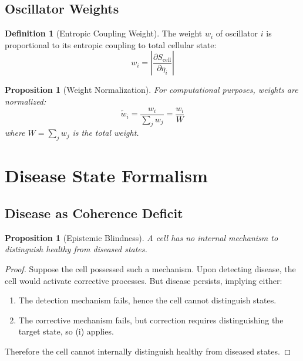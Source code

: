\documentclass[10pt,twocolumn]{article}
\theoremstyle{plain}
\newtheorem{proposition}[theorem]{Proposition}
\theoremstyle{definition}
\newtheorem{definition}[theorem]{Definition}
\theoremstyle{remark}
\begin{document}
\subsection{Oscillator Weights}

\begin{definition}[Entropic Coupling Weight]
\label{def:weight}
The weight $w_i$ of oscillator $i$ is proportional to its entropic coupling to total cellular state:
\begin{equation}
w_i = \left|\frac{\partial S_{\mathrm{cell}}}{\partial \eta_i}\right|
\label{eq:weight}
\end{equation}
\end{definition}

\begin{proposition}[Weight Normalization]
\label{prop:weight_norm}
For computational purposes, weights are normalized:
\begin{equation}
\tilde{w}_i = \frac{w_i}{\sum_j w_j} = \frac{w_i}{W}
\end{equation}
where $W = \sum_j w_j$ is the total weight.
\end{proposition}

\section{Disease State Formalism}
\label{sec:disease}

\subsection{Disease as Coherence Deficit}

\begin{proposition}[Epistemic Blindness]
\label{prop:blindness}
A cell has no internal mechanism to distinguish healthy from diseased states.
\end{proposition}

\begin{proof}
Suppose the cell possessed such a mechanism. Upon detecting disease, the cell would activate corrective processes. But disease persists, implying either:
\begin{enumerate}[label=(\roman*)]
\item The detection mechanism fails, hence the cell cannot distinguish states.
\item The corrective mechanism fails, but correction requires distinguishing the target state, so (i) applies.
\end{enumerate}
Therefore the cell cannot internally distinguish healthy from diseased states.
\end{proof}
\end{document}
